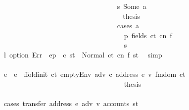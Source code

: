 \begin{isabellebody}
\ \ \ \ \ \ \ \ \ \ \ \ \ \ \ \ \ \ \ \ \ \ \ \ \ \ \ \ \ \ \ \ \isamarkupfalse%
\ s{}{\isacharcolon}{\kern0pt}\ {\isacharparenleft}{\kern0pt}Some\ a{\isacharparenright}{\kern0pt}\isanewline
\ \ \ \ \ \ \ \ \ \ \ \ \ \ \ \ \ \ \ \ \ \ \ \ \ \ \ \ \ \ \ \ \isamarkupfalse%
\ \isamarkupfalse%
\ {\isacharquery}{\kern0pt}thesis\isanewline
\ \ \ \ \ \ \ \ \ \ \ \ \ \ \ \ \ \ \ \ \ \ \ \ \ \ \ \ \ \ \ \ \isamarkupfalse%
\ {\isacharparenleft}{\kern0pt}cases\ a{\isacharparenright}{\kern0pt}\isanewline
\ \ \ \ \ \ \ \ \ \ \ \ \ \ \ \ \ \ \ \ \ \ \ \ \ \ \ \ \ \ \ \ \ \ \isamarkupfalse%
\ p{}{\isacharcolon}{\kern0pt}\ {\isacharparenleft}{\kern0pt}fields\ ct\ cn\ f{\isacharparenright}{\kern0pt}\isanewline
\ \ \ \ \ \ \ \ \ \ \ \ \ \ \ \ \ \ \ \ \ \ \ \ \ \ \ \ \ \ \ \ \ \ \isamarkupfalse%
\ s{}\ \isamarkupfalse%
\ l{}{\isacharcolon}{\kern0pt}\ {\isachardoublequoteopen}option\ Err\ {\isacharparenleft}{\kern0pt}{\isasymlambda}{\isacharunderscore}{\kern0pt}{\isachardot}{\kern0pt}\ ep\ {\isachardollar}{\kern0pt}{\isachardollar}{\kern0pt}\ c{\isacharparenright}{\kern0pt}\ st{\isacharprime}{\kern0pt}{\isacharprime}{\kern0pt}{\isacharprime}{\kern0pt}\ {\isacharequal}{\kern0pt}\ Normal\ {\isacharparenleft}{\kern0pt}{\isacharparenleft}{\kern0pt}ct{\isacharcomma}{\kern0pt}\ cn{\isacharcomma}{\kern0pt}\ f{\isacharparenright}{\kern0pt}{\isacharcomma}{\kern0pt}\ st{\isacharprime}{\kern0pt}{\isacharprime}{\kern0pt}{\isacharprime}{\kern0pt}{\isacharparenright}{\kern0pt}{\isachardoublequoteclose}\ \isamarkupfalse%
\ simp\isanewline
\ \ \ \ \ \ \ \ \ \ \ \ \ \ \ \ \ \ \ \ \ \ \ \ \ \ \ \ \ \ \ \ \ \ \isamarkupfalse%
\ e{\isacharprime}{\kern0pt}\ \ {\isachardoublequoteopen}e{\isacharprime}{\kern0pt}\ {\isacharequal}{\kern0pt}\ ffold{\isacharunderscore}{\kern0pt}init\ ct\ {\isacharparenleft}{\kern0pt}emptyEnv\ adv\ c\ {\isacharparenleft}{\kern0pt}address\ e{\isacharparenright}{\kern0pt}\ v{\isacharprime}{\kern0pt}{\isacharparenright}{\kern0pt}\ {\isacharparenleft}{\kern0pt}fmdom\ ct{\isacharparenright}{\kern0pt}{\isachardoublequoteclose}\isanewline
\ \ \ \ \ \ \ \ \ \ \ \ \ \ \ \ \ \ \ \ \ \ \ \ \ \ \ \ \ \ \ \ \ \ \isamarkupfalse%
\ {\isacharquery}{\kern0pt}thesis\isanewline
\ \ \ \ \ \ \ \ \ \ \ \ \ \ \ \ \ \ \ \ \ \ \ \ \ \ \ \ \ \ \ \ \ \ \isamarkupfalse%
\ {\isacharparenleft}{\kern0pt}cases\ {\isachardoublequoteopen}transfer\ {\isacharparenleft}{\kern0pt}address\ e{\isacharparenright}{\kern0pt}\ adv\ v{\isacharprime}{\kern0pt}\ {\isacharparenleft}{\kern0pt}accounts\ st{\isacharprime}{\kern0pt}{\isacharprime}{\kern0pt}{\isacharprime}{\kern0pt}{\isacharparenright}{\kern0pt}{\isachardoublequoteclose}{\isacharparenright}{\kern0pt}\isanewline

\end{isabellebody}
